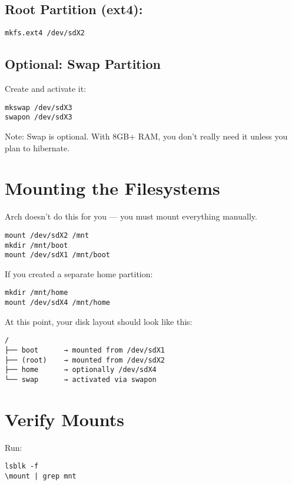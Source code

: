 \documentclass[12pt,openany]{book}
\begin{document}
\subsection*{Root Partition (ext4):}

\begin{lstlisting}
mkfs.ext4 /dev/sdX2
\end{lstlisting}

\subsection*{Optional: Swap Partition}

Create and activate it:

\begin{lstlisting}
mkswap /dev/sdX3
swapon /dev/sdX3
\end{lstlisting}

Note: Swap is optional. With 8GB+ RAM, you don’t really need it unless you plan to hibernate.

\section{Mounting the Filesystems}

Arch doesn't do this for you — you must mount everything manually.

\begin{lstlisting}
mount /dev/sdX2 /mnt
mkdir /mnt/boot
mount /dev/sdX1 /mnt/boot
\end{lstlisting}

If you created a separate home partition:

\begin{lstlisting}
mkdir /mnt/home
mount /dev/sdX4 /mnt/home
\end{lstlisting}

At this point, your disk layout should look like this:

\begin{lstlisting}
/
├── boot      → mounted from /dev/sdX1
├── (root)    → mounted from /dev/sdX2
├── home      → optionally /dev/sdX4
└── swap      → activated via swapon
\end{lstlisting}

\section{Verify Mounts}

Run:

\begin{lstlisting}
lsblk -f
\mount | grep mnt
\end{lstlisting}
\end{document}
